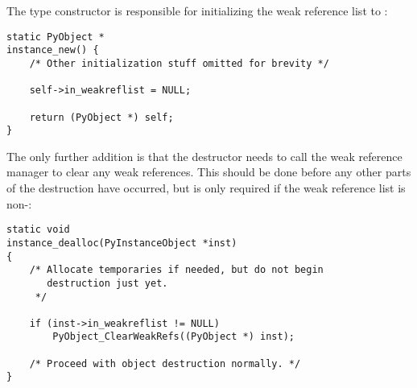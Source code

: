 The type constructor is responsible for initializing the weak reference
list to \NULL:

\begin{verbatim}
static PyObject *
instance_new() {
    /* Other initialization stuff omitted for brevity */

    self->in_weakreflist = NULL;

    return (PyObject *) self;
}
\end{verbatim}

The only further addition is that the destructor needs to call the
weak reference manager to clear any weak references.  This should be
done before any other parts of the destruction have occurred, but is
only required if the weak reference list is non-\NULL:

\begin{verbatim}
static void
instance_dealloc(PyInstanceObject *inst)
{
    /* Allocate temporaries if needed, but do not begin
       destruction just yet.
     */

    if (inst->in_weakreflist != NULL)
        PyObject_ClearWeakRefs((PyObject *) inst);

    /* Proceed with object destruction normally. */
}
\end{verbatim}

